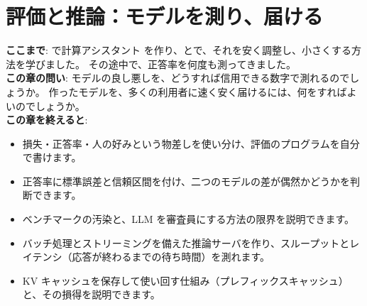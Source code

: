 \chapter{評価と推論：モデルを測り、届ける}\label{ch:eval-serving}

\begin{chapterlead}
\textbf{ここまで}: で計算アシスタント  を作り、とで、それを安く調整し、小さくする方法を学びました。
その途中で、正答率を何度も測ってきました。\\
\textbf{この章の問い}: モデルの良し悪しを、どうすれば信用できる数字で測れるのでしょうか。
作ったモデルを、多くの利用者に速く安く届けるには、何をすればよいのでしょうか。\\[1mm]
\textbf{この章を終えると}:
\begin{itemize}
\item 損失・正答率・人の好みという物差しを使い分け、評価のプログラムを自分で書けます。
\item 正答率に標準誤差と信頼区間を付け、二つのモデルの差が偶然かどうかを判断できます。
\item ベンチマークの汚染と、LLM を審査員にする方法の限界を説明できます。
\item バッチ処理とストリーミングを備えた推論サーバを作り、スループットとレイテンシ（応答が終わるまでの待ち時間）を測れます。
\item KV キャッシュを保存して使い回す仕組み（プレフィックスキャッシュ）と、その損得を説明できます。
\end{itemize}
\end{chapterlead}

